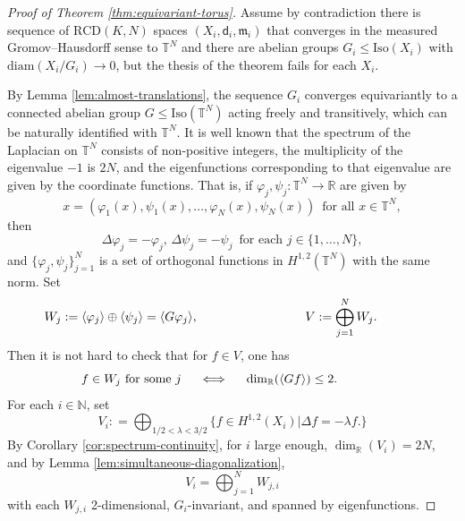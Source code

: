 \documentclass[12pt]{amsart}
\theoremstyle{definition}
\numberwithin{equation}{section}
\newcommand{\diam}{{\text {diam}}}
\newcommand{\iso}{\text{Iso}}
\newcommand{\sobo}{H^{1,2}}
\newcommand{\rcd}{\text{RCD}}
\newcommand{\mm}{\mathfrak{m}}
\newcommand{\R}{\mathbb{R}}
\begin{document}
\begin{proof}[Proof of Theorem \ref{thm:equivariant-torus}]



Assume by contradiction there is sequence of $\rcd (K,N)$ spaces $(X_i, \mathsf{d}_i, \mm _i )$ that converges in the measured Gromov--Hausdorff sense to $\mathbb{T}^N$ and there are abelian groups $G_i \leq \iso (X_i)$ with $\diam (X_i / G_i ) \to 0$,   but the thesis of the theorem fails for each $X_i$.


By Lemma \ref{lem:almost-translations}, the sequence $G_i$ converges equivariantly to a connected abelian group $G \leq \iso (\mathbb{T}^N)$ acting freely and transitively, which can be naturally identified with  $\mathbb{T}^N$. It is well known that the spectrum of the Laplacian on $\mathbb{T}^N$ consists of non-positive integers, the multiplicity of the eigenvalue $-1$ is $2N$, and the eigenfunctions corresponding to that eigenvalue are given by the coordinate functions. That is, if $\varphi_j, \psi_j : \mathbb{T}^N \to \mathbb{R}$ are given by 
\begin{equation}\label{eq:torus-inclusion}
    x = (  \varphi_1 (x) , \psi_1 (x), \ldots , \varphi_N (x) , \psi _N (x) ) \, \text{ for all } x \in \mathbb{T}^N  , 
\end{equation}  
then
\[   \Delta \varphi_j = - \varphi_j  , \,  \Delta \psi _j = - \psi _j \, \text{ for each } j \in \{ 1, \ldots , N \} ,   \]
and $ \{ \varphi_j, \psi _j \}_{j =1}^N $ is a set of orthogonal functions in $H^{1,2}(\mathbb{T}^N )$ with the same norm. Set 
\[   W_ j : = \langle \varphi_j \rangle \oplus \langle \psi_j\rangle   = \langle G \varphi _j \rangle  , \hspace{3cm} V : = \bigoplus_{j = 1 }^N W_j .  \hspace{1.2cm}        \]
Then it is not hard to check that for $f \in V$, one has
\begin{equation}\label{eq:f-dim-3}
    f \in W_j \text{ for some } j \hspace{0.5cm} \Longleftrightarrow \hspace{0.5cm} \dim _{\mathbb{R}}(\langle G f \rangle ) \leq 2 . \hspace{1.3cm}
\end{equation}
For each $i \in \mathbb{N}$, set 
\[   V_i : = \bigoplus_{1/2 < \lambda < 3/2} \{ f \in \sobo (X_i)  \vert \Delta f = - \lambda f .  \}     \]
By Corollary \ref{cor:spectrum-continuity}, for $i$ large enough, $\dim _{\R} (V_i )  = 2N$, and by Lemma \ref{lem:simultaneous-diagonalization},
\begin{equation}\label{eq:vi-decomposition}
     V_{i} = \bigoplus_{j=1}^N W_{j,i}    
\end{equation}
with each $W_{j,i}$ 2-dimensional, $G_i$-invariant, and spanned by eigenfunctions. 


\end{proof}
\end{document}
